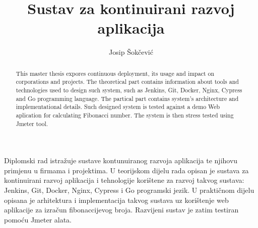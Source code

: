\documentclass[times, utf8, numeric, diplomski]{ferit}
\begin{document}
\sloppy
{} %
\title{Sustav za kontinuirani razvoj aplikacija}

\author{Josip Šokčević}
\maketitle



\tableofcontents














\begin{sazetak}
Diplomski rad istražuje sustave kontunuiranog razvoja aplikacija te njihovu primjenu u firmama i
projektima. U teorijskom dijelu rada opisan je sustava za kontinuirani razvoj aplikacija i
tehnologije korištene za razvoj takvog sustava: Jenkins, Git, Docker, Nginx, Cypress i Go
programski jezik. U praktičnom dijelu opisana je arhitektura i implementacija takvog sustava uz
korištenje web aplikacije za izračun fibonaccijevog broja. Razvijeni sustav je zatim testiran
pomoću Jmeter alata.

\end{sazetak}

\begin{abstract}
This master thesis expores continuous deployment, its usage and impact on corporations and projects.
The theoretical part contains information about tools and technologies used to design such system,
such as Jenkins, Git, Docker, Nginx, Cypress and Go programming language. The partical part contains
system's architecture and implementational details. Such designed system is tested against a demo
Web aplication for calculating Fibonacci number. The system is then stress tested using Jmeter tool.

\end{abstract}


\end{document}
